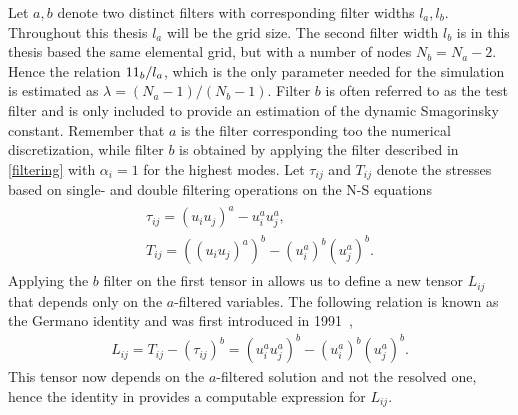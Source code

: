 Let $a,b$ denote two distinct filters with corresponding filter widths $l_a,l_b$. 
Throughout this thesis $l_a$ will be the grid size. The second filter width $l_b$ 
is in this thesis based the same elemental grid, but with a number of nodes $N_b = N_a - 2$.
Hence the relation $11_b/l_a$, which is the only parameter needed for the simulation is estimated as $\lambda = (N_a-1)/(N_b-1)$.
Filter $b$ is often referred to as the test filter and is only included to provide an estimation 
of the dynamic Smagorinsky constant. Remember that $a$ is the filter corresponding too the numerical discretization, while 
filter $b$ is obtained by applying the filter described in \cref{filtering} with $\alpha_i=1$ for the highest modes.
Let $\tau_{ij}$ and $T_{ij}$ denote the stresses based on single- and double filtering
operations on the N-S equations
\begin{align}
    \begin{split}
    \tau_{ij} = (u_iu_j)^a - u_i^au_j^a,\\
    T_{ij} = ((u_iu_j)^a)^b - (u_i^a)^b(u_j^a)^b.
    \end{split}
    \label{eq:stresstensors}
\end{align}
Applying the $b$ filter on the first tensor in  allows us to define 
a new tensor $L_{ij}$ that depends only on the $a$-filtered variables. The following relation
is known as the Germano identity and was first introduced in 1991~\cite{Germano91},
\begin{align}
    L_{ij} = T_{ij} - (\tau_{ij})^b
    = (u_i^au_j^a)^b - (u_i^a)^b(u_j^a)^b.
    \label{eq:germanoid}
\end{align}
This tensor now depends on the $a$-filtered solution and not the resolved 
one, hence the identity in  provides a computable expression for $L_{ij}$.


